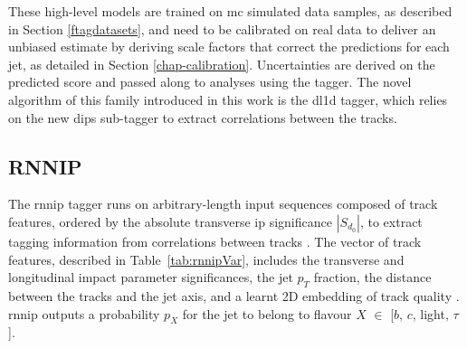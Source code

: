These high-level models are trained on \gls{mc} simulated data samples, as described in Section \ref{ftagdatasets}, and need to be calibrated on real data to deliver an unbiased estimate by deriving scale factors that correct the predictions for each jet, as detailed in Section \ref{chap-calibration}. Uncertainties are derived on the predicted score and passed along to analyses using the tagger. The novel algorithm of this family introduced in this work is the \gls{dl1d} tagger, which relies on the new \gls{dips} sub-tagger to extract correlations between the tracks.  

\subsection{RNNIP}
The \gls{rnnip} tagger runs on arbitrary-length input sequences composed of track features, ordered by the absolute transverse \gls{ip} significance $|S_{d_0}|$, to extract tagging information from correlations between tracks \cite{ATL-PHYS-PUB-2017-003}. The vector of track features, described in Table~\ref{tab:rnnipVar}, includes the transverse and longitudinal impact parameter significances, the jet $p_T$ fraction, the distance between the tracks and the jet axis, and a learnt 2D embedding of track quality \cite{Paganini:2289214}. \gls{rnnip} outputs a probability $p_X$ for the jet to belong to flavour $X$ $\in$ [$b$, $c$, light, $\tau$]. 

